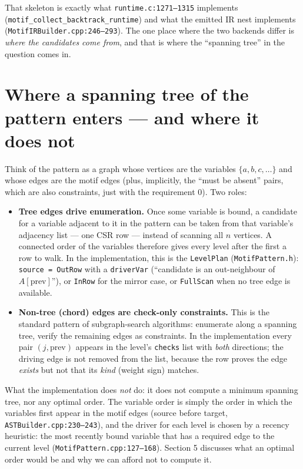 \documentclass[11pt,a4paper]{article}
\newcommand{\code}[1]{\texttt{#1}}
\newcommand{\file}[1]{\texttt{#1}}
\begin{document}
That skeleton is exactly what \file{runtime.c:1271--1315} implements
(\code{motif\_collect\_backtrack\_runtime}) and what the emitted IR nest
implements (\file{MotifIRBuilder.cpp:246--293}). The one place where the two
backends differ is \emph{where the candidates come from}, and that is where the
``spanning tree'' in the question comes in.

\section{Where a spanning tree of the pattern enters --- and where it does not}

Think of the pattern as a graph whose vertices are the variables
$\{a,b,c,\dots\}$ and whose edges are the motif edges (plus, implicitly, the
``must be absent'' pairs, which are also constraints, just with the requirement
$0$). Two roles:

\begin{itemize}
  \item \textbf{Tree edges drive enumeration.} Once some variable is bound, a
        candidate for a variable adjacent to it in the pattern can be taken from
        that variable's adjacency list --- one CSR row --- instead of scanning
        all $n$ vertices. A connected order of the variables therefore gives
        every level after the first a row to walk. In the implementation, this is
        the \code{LevelPlan} (\file{MotifPattern.h}): \code{source = OutRow}
        with a \code{driverVar} (``candidate is an out-neighbour of
        $A[\text{prev}]$''), or \code{InRow} for the mirror case, or
        \code{FullScan} when no tree edge is available.
  \item \textbf{Non-tree (chord) edges are check-only constraints.} This is the
        standard pattern of subgraph-search algorithms: enumerate along a
        spanning tree, verify the remaining edges as constraints. In the
        implementation every pair $(j,\text{prev})$ appears in the level's
        \code{checks} list with \emph{both} directions; the driving edge is not
        removed from the list, because the row proves the edge \emph{exists} but
        not that its \emph{kind} (weight sign) matches.
\end{itemize}

What the implementation does \emph{not} do: it does not compute a minimum
spanning tree, nor any optimal order. The variable order is simply the order in
which the variables first appear in the motif edges (source before target,
\file{ASTBuilder.cpp:230--243}), and the driver for each level is chosen by a
recency heuristic: the most recently bound variable that has a required edge to
the current level (\file{MotifPattern.cpp:127--168}). Section 5 discusses what an
optimal order would be and why we can afford not to compute it.
\end{document}
